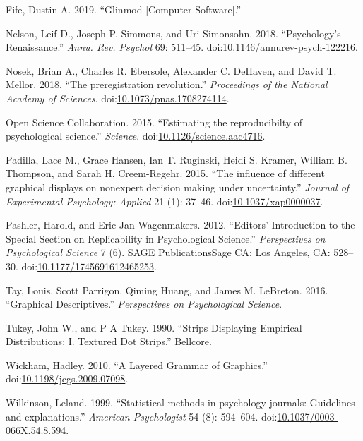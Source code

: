 \documentclass[,]{book}
\begin{document}
\hypertarget{ref-Fife2019}{}
Fife, Dustin A. 2019. ``Glinmod {[}Computer Software{]}.''

\hypertarget{ref-Nelson2018}{}
Nelson, Leif D., Joseph P. Simmons, and Uri Simonsohn. 2018.
``Psychology's Renaissance.'' \emph{Annu. Rev. Psychol} 69: 511--45.
doi:\href{https://doi.org/10.1146/annurev-psych-122216}{10.1146/annurev-psych-122216}.

\hypertarget{ref-Nosek2018}{}
Nosek, Brian A., Charles R. Ebersole, Alexander C. DeHaven, and David T.
Mellor. 2018. ``The preregistration revolution.'' \emph{Proceedings of
the National Academy of Sciences}.
doi:\href{https://doi.org/10.1073/pnas.1708274114}{10.1073/pnas.1708274114}.

\hypertarget{ref-OpenScienceCollaboration2015}{}
Open Science Collaboration. 2015. ``Estimating the reproducibilty of
psychological science.'' \emph{Science}.
doi:\href{https://doi.org/10.1126/science.aac4716}{10.1126/science.aac4716}.

\hypertarget{ref-Padilla2015}{}
Padilla, Lace M., Grace Hansen, Ian T. Ruginski, Heidi S. Kramer,
William B. Thompson, and Sarah H. Creem-Regehr. 2015. ``The influence of
different graphical displays on nonexpert decision making under
uncertainty.'' \emph{Journal of Experimental Psychology: Applied} 21
(1): 37--46.
doi:\href{https://doi.org/10.1037/xap0000037}{10.1037/xap0000037}.

\hypertarget{ref-Pashler2012a}{}
Pashler, Harold, and Eric-Jan Wagenmakers. 2012. ``Editors' Introduction
to the Special Section on Replicability in Psychological Science.''
\emph{Perspectives on Psychological Science} 7 (6). SAGE
PublicationsSage CA: Los Angeles, CA: 528--30.
doi:\href{https://doi.org/10.1177/1745691612465253}{10.1177/1745691612465253}.

\hypertarget{ref-Tay2016}{}
Tay, Louis, Scott Parrigon, Qiming Huang, and James M. LeBreton. 2016.
``Graphical Descriptives.'' \emph{Perspectives on Psychological
Science}.

\hypertarget{ref-Tukey1990}{}
Tukey, John W., and P A Tukey. 1990. ``Strips Displaying Empirical
Distributions: I. Textured Dot Strips.'' Bellcore.

\hypertarget{ref-Wickham2010}{}
Wickham, Hadley. 2010. ``A Layered Grammar of Graphics.''
doi:\href{https://doi.org/10.1198/jcgs.2009.07098}{10.1198/jcgs.2009.07098}.

\hypertarget{ref-Wilkinson1999}{}
Wilkinson, Leland. 1999. ``Statistical methods in psychology journals:
Guidelines and explanations.'' \emph{American Psychologist} 54 (8):
594--604.
doi:\href{https://doi.org/10.1037/0003-066X.54.8.594}{10.1037/0003-066X.54.8.594}.
\end{document}
